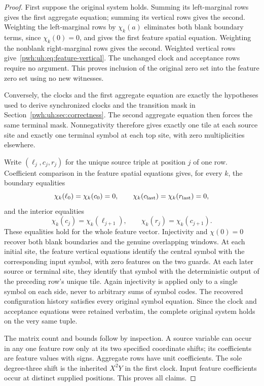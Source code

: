 \documentclass[11pt,letterpaper]{article}
\numberwithin{equation}{section}
\theoremstyle{definition}
\begin{document}
\begin{proof}
First suppose the original system holds. Summing its left-marginal rows
gives the first aggregate equation; summing its vertical rows gives the
second. Weighting the left-marginal rows by $\chi_k(a)$ eliminates both
blank boundary terms, since $\chi_k(0)=0$, and gives the first feature
spatial equation. Weighting the nonblank right-marginal rows gives the
second. Weighted vertical rows give~\eqref{pwh:uh:eq:feature-vertical}. The
unchanged clock and acceptance rows require no argument. This proves
inclusion of the original zero set into the feature zero set using no
new witnesses.

Conversely, the clocks and the first aggregate equation are exactly the
hypotheses used to derive synchronized clocks and the transition mask in
Section~\ref{pwh:uh:sec:correctness}. The second aggregate equation then forces
the same terminal mask. Nonnegativity therefore gives exactly one tile
at each source site and exactly one terminal symbol at each top site,
with zero multiplicities elsewhere.

Write $(\ell_j,c_j,r_j)$ for the unique source triple at position $j$ of
one row. Coefficient comparison in the feature spatial equations gives,
for every $k$, the boundary equalities
\[
 \chi_k(\ell_0)=\chi_k(c_0)=0,\qquad
 \chi_k(c_{\rm last})=\chi_k(r_{\rm last})=0,
\]
and the interior equalities
\[
 \chi_k(c_j)=\chi_k(\ell_{j+1}),\qquad
 \chi_k(r_j)=\chi_k(c_{j+1}).
\]
These equalities hold for the whole feature vector. Injectivity and
$\chi(0)=0$ recover both blank boundaries and the genuine overlapping
windows. At each initial site, the feature vertical equations identify
the central symbol with the corresponding input symbol, with zero
features on the two guards. At each later source or terminal site, they
identify that symbol with the deterministic output of the preceding
row's unique tile. Again injectivity is applied only to a single symbol
on each side, never to arbitrary sums of symbol codes. The recovered
configuration history satisfies every original symbol equation. Since
the clock and acceptance equations were retained verbatim, the complete
original system holds on the very same tuple.

The matrix count and bounds follow by inspection. A source variable can
occur in any one feature row only at its two specified coordinate shifts;
its coefficients are feature values with signs. Aggregate rows have
unit coefficients. The sole degree-three shift is the inherited $X^2Y$
in the first clock. Input feature coefficients occur at distinct supplied
positions. This proves all claims.
\end{proof}
\end{document}
